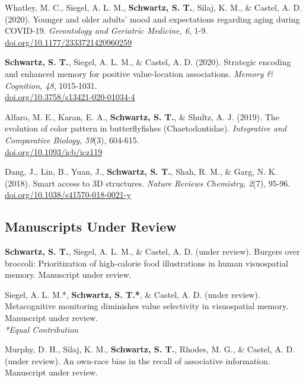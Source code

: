 \pubspace

Whatley, M. C., Siegel, A. L. M., \textbf{Schwartz, S. T.}, Silaj, K. M., \& Castel, A. D. (2020). Younger and older adults' mood and expectations regarding aging during COVID-19. \textit{Gerontology and Geriatric Medicine, 6}, 1-9. \textcolor{RoyalBlue}{\href{https://doi.org/10.1177/2333721420960259}{doi.org/10.1177/2333721420960259}}

\pubspace

\textbf{Schwartz, S. T.}, Siegel, A. L. M., \& Castel, A. D. (2020). Strategic encoding and enhanced memory for positive value-location associations. \textit{Memory \& Cognition, 48}, 1015-1031. \\ \textcolor{RoyalBlue}{\href{https://doi.org/10.3758/s13421-020-01034-4}{doi.org/10.3758/s13421-020-01034-4}}

\pubspace

Alfaro, M. E., Karan, E. A., \textbf{Schwartz, S. T.}, \& Shultz, A. J. (2019). The evolution of color pattern in butterflyfishes (Chaetodontidae). \textit{Integrative and Comparative Biology, 59}(3), 604-615.\\ \textcolor{RoyalBlue}{\href{https://doi.org/10.1093/icb/icz119}{doi.org/10.1093/icb/icz119}}

\pubspace

Dang, J., Lin, B., Yuan, J., \textbf{Schwartz, S. T.}, Shah, R. M., \& Garg, N. K. (2018). Smart access to 3D structures. \textit{Nature Reviews Chemistry, 2}(7), 95-96. \textcolor{RoyalBlue}{\href{https://doi.org/10.1038/s41570-018-0021-y}{doi.org/10.1038/s41570-018-0021-y}}

\subsection*{Manuscripts Under Review}
\textbf{Schwartz, S. T.}, Siegel, A. L. M., \& Castel, A. D. (under review). Burgers over broccoli: Prioritization of high-calorie food illustrations in human visuospatial memory. Manuscript under review.

\pubspace

Siegel, A. L. M.*, \textbf{Schwartz, S. T.*}, \& Castel, A. D. (under review). Metacognitive monitoring diminishes value selectivity in visuospatial memory. Manuscript under review.
\\ \textit{*Equal Contribution}

\pubspace

Murphy, D. H., Silaj, K. M., \textbf{Schwartz, S. T.}, Rhodes, M. G., \& Castel, A. D. (under review). An own-race bias in the recall of associative information. Manuscript under review.

